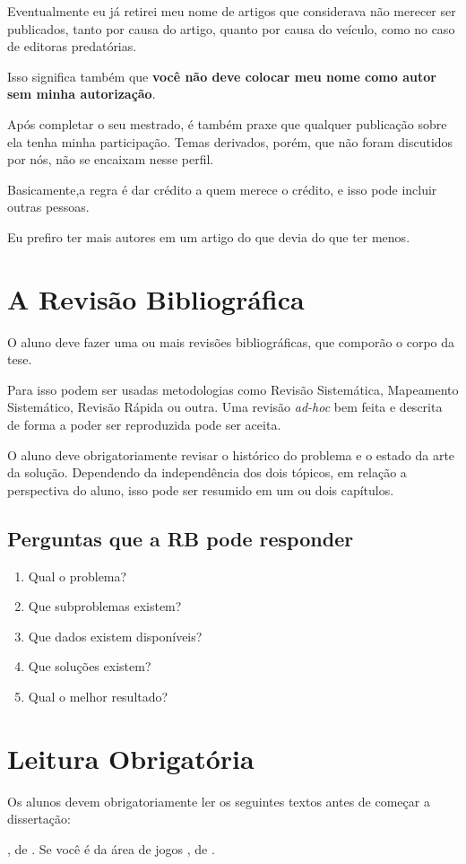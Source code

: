 \documentclass{book}
\newcommand{\listalivro}[1]{\citetitle{#1}, de \citet{#1}.}
\begin{document}
Eventualmente eu já retirei meu nome de artigos que considerava não merecer ser publicados, tanto por causa do artigo, quanto por causa do veículo, como no caso de editoras predatórias.

Isso significa também que \textbf{você não deve colocar meu nome como autor sem minha autorização}.

Após completar o seu mestrado, é também praxe que qualquer publicação sobre ela tenha minha participação. 
Temas derivados, porém, que não foram discutidos por nós, não se encaixam nesse perfil. 

Basicamente,a regra é dar crédito a quem merece o crédito, e isso pode incluir outras pessoas. 

Eu prefiro ter mais autores em um artigo do que devia do que ter menos.

\chapter{A Revisão Bibliográfica}

O aluno deve fazer uma ou mais revisões bibliográficas, que comporão o corpo da tese. 

Para isso podem ser usadas metodologias como Revisão Sistemática, Mapeamento Sistemático, Revisão Rápida ou outra. Uma revisão \textit{ad-hoc} bem feita e descrita de forma a poder ser reproduzida pode ser aceita.

O aluno deve obrigatoriamente revisar o histórico do problema e o estado da arte da solução. Dependendo da independência dos dois tópicos, em relação a perspectiva do aluno, isso pode ser resumido em um ou dois capítulos.

\section{Perguntas que a RB pode responder}
\begin{enumerate}
    \item Qual o problema?
    \item Que subproblemas existem?
    \item Que dados existem disponíveis?
    \item Que soluções existem? 
    \item Qual o melhor resultado?
\end{enumerate}

\chapter{Leitura Obrigatória}

Os alunos devem obrigatoriamente ler os seguintes textos antes de começar a dissertação:
\begin{outline}
\1 \listalivro{Dresch:2015}
\1 Se você é da área de jogos
\2 \listalivro{Xexeo:2017}
\end{outline}

\backmatter
\printbibliography
\end{document}
